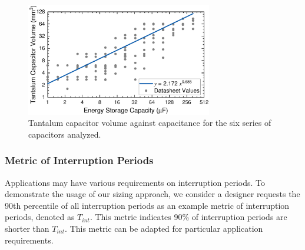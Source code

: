 \begin{figure}[!t]
    \centering
    \includegraphics[width=3.2in]{ch4_sizingapproach/figures/CapVol2Fig2}
    \caption{Tantalum capacitor volume against capacitance for the six series of capacitors analyzed. }
    \label{fig:capvol}
\end{figure}

\subsubsection{Metric of Interruption Periods}


Applications may have various requirements on interruption periods. To demonstrate the usage of our sizing approach, we consider a designer requests the 90th percentile of all interruption periods as an example metric of interruption periods, denoted as $T_{int}$. This metric indicates 90\% of interruption periods are shorter than $T_{int}$. This metric can be adapted for particular application requirements. 


